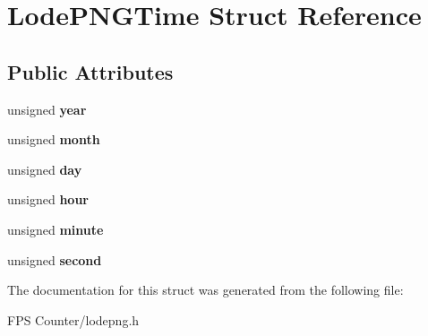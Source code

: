 \hypertarget{struct_lode_p_n_g_time}{}\section{Lode\+P\+N\+G\+Time Struct Reference}
\label{struct_lode_p_n_g_time}
\subsection*{Public Attributes}
\begin{DoxyCompactItemize}
\item 
\mbox{\label{struct_lode_p_n_g_time_a32b68342f39f3d38ba91a721b1149b8f}} 
unsigned {\bfseries year}
\item 
\mbox{\label{struct_lode_p_n_g_time_a295d890e862d5cd0c444e9d3a96fa9d5}} 
unsigned {\bfseries month}
\item 
\mbox{\label{struct_lode_p_n_g_time_aa3dee3b7b3a1e730fbded7a7b8cf355e}} 
unsigned {\bfseries day}
\item 
\mbox{\label{struct_lode_p_n_g_time_ac99cb7f3ce16a85f9f505b7f5f6e0aa7}} 
unsigned {\bfseries hour}
\item 
\mbox{\label{struct_lode_p_n_g_time_ac3045de79728f29fc61f534b062e0f13}} 
unsigned {\bfseries minute}
\item 
\mbox{\label{struct_lode_p_n_g_time_a6c691c5821e828488a8bb8a90751a2f0}} 
unsigned {\bfseries second}
\end{DoxyCompactItemize}


The documentation for this struct was generated from the following file\+:\begin{DoxyCompactItemize}
\item 
F\+P\+S Counter/lodepng.\+h\end{DoxyCompactItemize}

